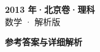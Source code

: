 \documentclass[zihao=-4, a4paper]{ctexart}
\begin{document}
\begin{center}
  {\Large\bfseries 2013 年·北京卷·理科}\\[4pt]
  {\large 数学 · 解析版}
\end{center}
\medskip
{}

\clearpage
{}
\begin{center}{\Large\bfseries 参考答案与详细解析}\end{center}
\medskip

\end{document}
